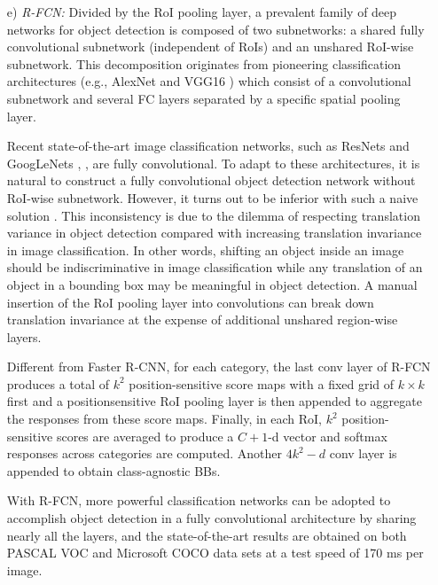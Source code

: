 \documentclass[two column]{ieeeaccess}
\begin{document}
\begin{itemize}
    \item[e)]\textit{R-FCN: } Divided by the RoI pooling layer, a prevalent family \cite{16,17} of deep networks for object detection is composed of two subnetworks: a shared fully convolutional subnetwork (independent of RoIs) and an unshared RoI-wise subnetwork. This decomposition originates from pioneering classification architectures (e.g., AlexNet \cite{6} and VGG16 \cite{46}) which consist of a convolutional subnetwork and several FC layers separated by a specific spatial pooling layer. 
    
    Recent state-of-the-art image classification networks, such as ResNets \cite{47} and GoogLeNets \cite{45}, \cite{93}, are fully convolutional. To adapt to these architectures, it is natural to construct a fully convolutional object detection network without RoI-wise subnetwork. However, it turns out to be inferior with such a naive solution \cite{47}. This inconsistency is due to the dilemma of respecting translation variance in object detection compared with increasing translation invariance in image classification. In other words, shifting an object inside an image should be indiscriminative in image classification while any translation of an object in a bounding box may be meaningful in object detection. A manual insertion of the RoI pooling layer into convolutions can break down translation invariance at the expense of additional unshared region-wise layers. 
    
    Different from Faster R-CNN, for each category, the last conv layer of R-FCN produces a total of $k^2$ position-sensitive score maps with a fixed grid of $k \times k$ first and a positionsensitive RoI pooling layer is then appended to aggregate the responses from these score maps. Finally, in each RoI, $k^2$ position-sensitive scores are averaged to produce a $C + 1$-d vector and softmax responses across categories are computed. Another $4k^2-d$ conv layer is appended to obtain class-agnostic BBs. 
    
    With R-FCN, more powerful classification networks can be adopted to accomplish object detection in a fully convolutional architecture by sharing nearly all the layers, and the state-of-the-art results are obtained on both PASCAL VOC and Microsoft COCO \cite{94} data sets at a test speed of 170 ms per image. \\
    

\end{itemize}
\end{document}
